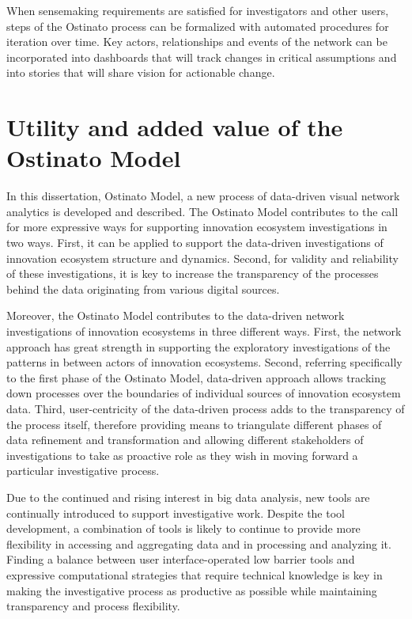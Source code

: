 When sensemaking requirements are satisfied for investigators and other users, steps of the Ostinato process can be formalized with automated procedures for iteration over time. Key actors, relationships and events of the network can be incorporated into dashboards that will track changes in critical assumptions and into stories that will share vision for actionable change.

\section{Utility and added value of the Ostinato Model}

In this dissertation, Ostinato Model, a new process of data-driven visual network analytics is developed and described. The Ostinato Model contributes to the call for more expressive ways for supporting innovation ecosystem investigations in two ways. First, it can be applied to support the data-driven investigations of innovation ecosystem structure and dynamics. Second, for validity and reliability of these investigations, it is key to increase the transparency of the processes behind the data originating from various digital sources.

Moreover, the Ostinato Model contributes to the data-driven network investigations of innovation ecosystems in three different ways. First, the network approach has great strength in supporting the exploratory investigations of the patterns in between actors of innovation ecosystems. Second, referring specifically to the first phase of the Ostinato Model, data-driven approach allows tracking down processes over the boundaries of individual sources of innovation ecosystem data. Third, user-centricity of the data-driven process adds to the transparency of the process itself, therefore providing means to triangulate different phases of data refinement and transformation and allowing different stakeholders of investigations to take as proactive role as they wish in moving forward a particular investigative process.

Due to the continued and rising interest in big data analysis, new tools are continually introduced to support investigative work. Despite the tool development, a combination of tools is likely to continue to provide more flexibility in accessing and aggregating data and in processing and analyzing it. Finding a balance between user interface-operated low barrier tools and expressive computational strategies that require technical knowledge is key in making the investigative process as productive as possible while maintaining transparency and process flexibility.

